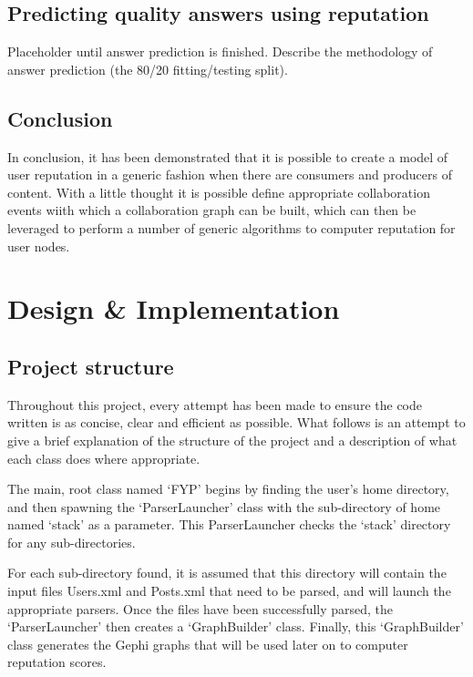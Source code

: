 \documentclass[]{final_report}
\begin{document}
\section{Predicting quality answers using reputation}

Placeholder until answer prediction is finished. Describe the methodology of answer prediction (the 80/20 fitting/testing split).

\section{Conclusion}

In conclusion, it has been demonstrated that it is possible to create a model of user reputation in a generic fashion when there are consumers and producers of content. With a little thought it is possible define appropriate collaboration events wiith which a collaboration graph can be built, which can then be leveraged to perform a number of generic algorithms to computer reputation for user nodes. 

\chapter{Design \& Implementation}


\section{Project structure}

Throughout this project, every attempt has been made to ensure the code written is as concise, clear and efficient as possible. What follows is an attempt to give a brief explanation of the structure of the project and a description of what each class does where appropriate. 

The main, root class named `FYP' begins by finding the user's home directory, and then spawning the `ParserLauncher' class with the sub-directory of home named `stack' as a parameter. This ParserLauncher checks the `stack' directory for any sub-directories. 

For each sub-directory found, it is assumed that this directory will contain the input files Users.xml and Posts.xml that need to be parsed, and will launch the appropriate parsers. Once the files have been successfully parsed, the `ParserLauncher' then creates a `GraphBuilder' class. Finally, this `GraphBuilder' class generates the Gephi graphs that will be used later on to computer reputation scores.
\end{document}

